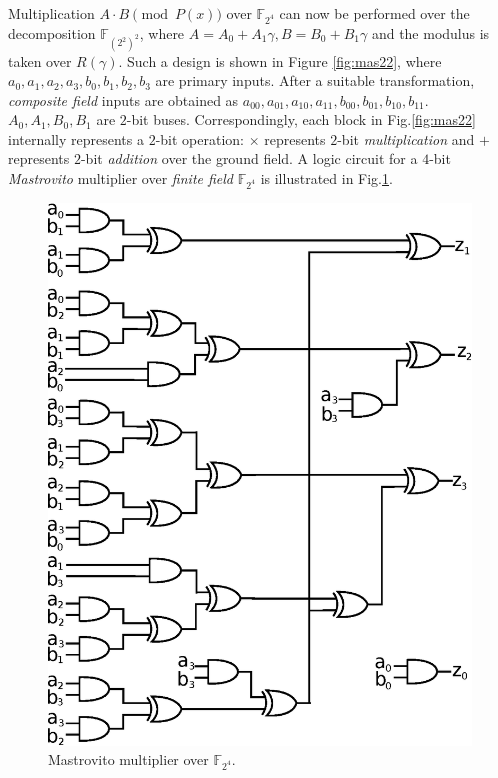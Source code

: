 Multiplication $A\cdot B \pmod{ P(x)}$ over $\mathbb{F}_{2^4}$ can now be
performed over the decomposition $\mathbb{F}_{(2^2)^2}$, where $A = A_0 +
A_1\gamma, B = B_0 + B_1 \gamma$ and  the modulus is taken over
$R(\gamma)$. Such a design is shown in Figure \ref{fig:mas22}, where 
$a_0, a_1,a_2,a_3, b_0,b_1,b_2,b_3$ are primary inputs. After
a suitable transformation, {\it composite field} inputs are obtained as
$a_{00},a_{01},a_{10},a_{11},b_{00},b_{01},b_{10},b_{11}$. $A_0,A_1,B_0,B_1$
are $2$-bit buses. Correspondingly, each block in Fig.\ref{fig:mas22}
internally represents a $2$-bit operation: $\times$ represents $2$-bit
{\it multiplication}  and $+$ represents $2$-bit {\it addition} over
the ground field. 
A logic circuit for a $4$-bit {\it Mastrovito} multiplier over {\it finite field} $\mathbb{F}_{2^4}$ is illustrated in Fig.\ref{fig:mas4}.

\begin{figure}[htb]
	\begin{center}
	\includegraphics[scale=0.50]{figures/mul4bit.eps}
	\end{center}
	\caption{Mastrovito multiplier over $\mathbb{F}_{2^4}$.}
	\label{fig:mas4}
\end{figure}

